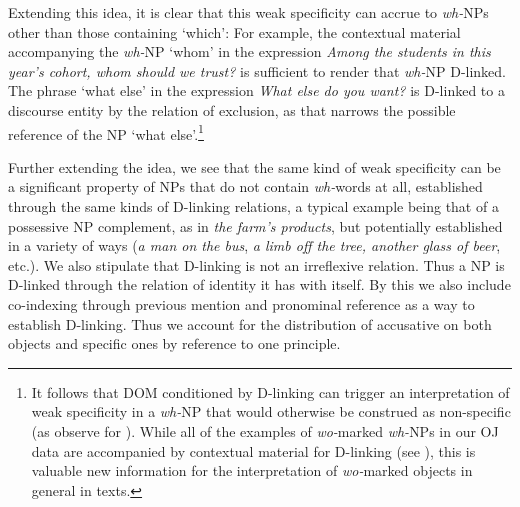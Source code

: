 \documentclass[output=paper]{LSP/langsci}
\begin{document}
Extending this idea, it is clear that this weak specificity can accrue
to \textit{wh-}NPs other than those containing ‘which’: For example,
the contextual material accompanying the \textit{wh-}NP ‘whom’ in the
expression \textit{Among the students in this year’s cohort, whom
 should we trust?} is sufficient to render that \textit{wh-}NP
D-linked. The phrase ‘what else’ in the expression \textit{What else
 do you want?} is D-linked to a  discourse entity by the
relation of exclusion, as that narrows the possible reference of the
NP ‘what else’.\footnote{It follows that DOM conditioned by D-linking
 can trigger an interpretation of weak specificity in a
\textit{wh-}NP that would otherwise be construed as non-specific (as
\citealt[210–211]{Dalrympleetal2011Objects} observe for ).
 While all of the examples of \textit{wo-}marked \textit{wh-}NPs in
 our OJ data are accompanied by contextual material for D-linking
 (see ), this is valuable new information for the
 interpretation of \textit{wo-}marked objects in general in  texts.}

Further extending the idea, we see that the same kind of weak
specificity can be a significant property of  NPs that do not
contain \textit{wh-}words at all, established through the same kinds
of D-linking relations, a typical example being that of a 
possessive NP complement, as in \textit{the farm's products}, but
potentially established in a variety of ways (\eg \textit{a man on
 the bus}, \textit{a limb off the tree, another glass of beer},
etc.). We also stipulate that D-linking is not an irreflexive
relation. Thus a  NP is D-linked through the relation of
identity it has with itself. By this we also include co-indexing
through previous mention and pronominal reference as a way to
establish D-linking. Thus we account for the distribution of
accusative  on both  objects and 
specific ones by reference to one principle.
\end{document}
